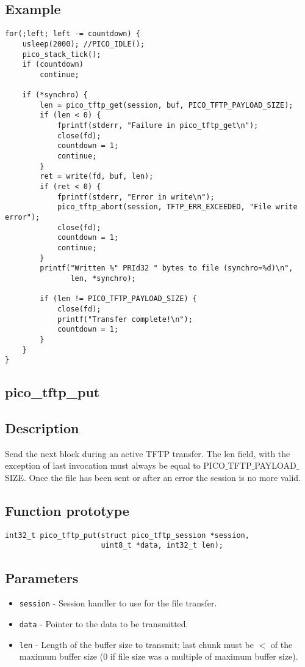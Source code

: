 \subsection*{Example}
\begin{verbatim}
for(;left; left -= countdown) {
    usleep(2000); //PICO_IDLE();
    pico_stack_tick();
    if (countdown)
        continue;

    if (*synchro) {
        len = pico_tftp_get(session, buf, PICO_TFTP_PAYLOAD_SIZE);
        if (len < 0) {
            fprintf(stderr, "Failure in pico_tftp_get\n");
            close(fd);
            countdown = 1;
            continue;
        }
        ret = write(fd, buf, len);
        if (ret < 0) {
            fprintf(stderr, "Error in write\n");
            pico_tftp_abort(session, TFTP_ERR_EXCEEDED, "File write error");
            close(fd);
            countdown = 1;
            continue;
        }
        printf("Written %" PRId32 " bytes to file (synchro=%d)\n",
               len, *synchro);

        if (len != PICO_TFTP_PAYLOAD_SIZE) {
            close(fd);
            printf("Transfer complete!\n");
            countdown = 1;
        }
    }
}
\end{verbatim}


\subsection{pico\_tftp\_put}

\subsection*{Description}
Send the next block during an active TFTP transfer. The len field, with the exception of last invocation must always be equal to PICO$\_$TFTP$\_$PAYLOAD$\_$SIZE. Once the file has been sent or after an error the session is no more valid.

\subsection*{Function prototype}
\begin{verbatim}
int32_t pico_tftp_put(struct pico_tftp_session *session,
                      uint8_t *data, int32_t len);
\end{verbatim}

\subsection*{Parameters}
\begin{itemize}[noitemsep]
\item \texttt{session} - Session handler to use for the file transfer.
\item \texttt{data} - Pointer to the data to be transmitted.
\item \texttt{len} - Length of the buffer size to transmit; last chunk must be $<$ of the maximum buffer size (0 if file size was a multiple of maximum buffer size).

\end{itemize}

